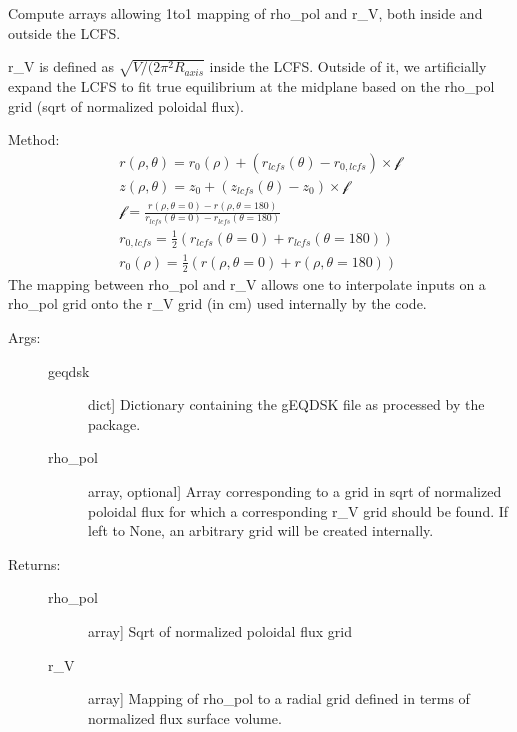 \documentclass[letterpaper,10pt,english]{sphinxmanual}
\begin{document}
\begin{fulllineitems}
\label{\detokenize{aurora:aurora.grids_utils.get_rhopol_rV_mapping}}
Compute arrays allowing 1\sphinxhyphen{}to\sphinxhyphen{}1 mapping of rho\_pol and r\_V, both inside and
outside the LCFS.

r\_V is defined as \(\sqrt{V/(2 \pi^2 R_{axis}}\) inside the LCFS. Outside of it,
we artificially expand the LCFS to fit true equilibrium at the midplane based
on the rho\_pol grid (sqrt of normalized poloidal flux).

Method:
\begin{equation*}
\begin{split}r(\rho,\theta) = r_0(\rho) +  (r_{lcfs}(\theta) - r_{0,lcfs}) \times \mathcal{f} \\
z(\rho,\theta) = z_0      +  (z_{lcfs}(\theta) - z_0     ) \times \mathcal{f} \\
\mathcal{f} = \frac{ r(\rho,\theta=0) - r(\rho,\theta=180)}{r_{lcfs}(\theta=0)- r_{lcfs}(\theta=180)} \\
r_{0,lcfs} = \frac{1}{2} (r_{lcfs}(\theta=0)+ r_{lcfs}(\theta=180)) \\
r_0(\rho) = \frac{1}{2} (r(\rho,\theta=0) + r(\rho,\theta=180))\end{split}
\end{equation*}
The mapping between rho\_pol and r\_V allows one to interpolate inputs on a
rho\_pol grid onto the r\_V grid (in cm) used internally by the code.
\begin{description}
\item[{Args:}] \leavevmode\begin{description}
\item[{geqdsk}] \leavevmode{[}dict{]}
Dictionary containing the g\sphinxhyphen{}EQDSK file as processed by the 
package.

\item[{rho\_pol}] \leavevmode{[}array, optional{]}
Array corresponding to a grid in sqrt of normalized poloidal flux for which a 
corresponding r\_V grid should be found. If left to None, an arbitrary grid will be 
created internally.

\end{description}

\item[{Returns:}] \leavevmode\begin{description}
\item[{rho\_pol}] \leavevmode{[}array{]}
Sqrt of normalized poloidal flux grid

\item[{r\_V}] \leavevmode{[}array{]}
Mapping of rho\_pol to a radial grid defined in terms of normalized flux surface volume.

\end{description}

\end{description}

\end{fulllineitems}
\end{document}
